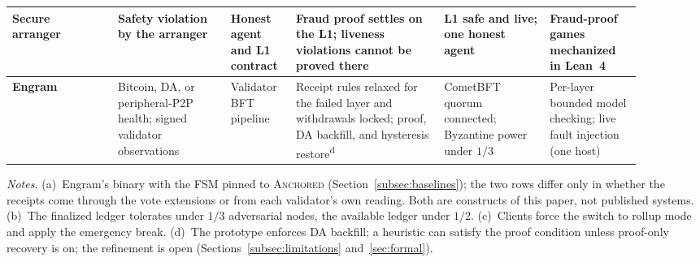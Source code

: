 {\begin{longtable}{@{}>{\rc}p{0.155\linewidth}>{\rc}p{0.16\linewidth}>{\rc}p{0.09\linewidth}>{\rc}p{0.215\linewidth}>{\rc}p{0.15\linewidth}>{\rc}p{0.13\linewidth}@{}}
Secure arranger~\mbox{\cite{capretto2025secure}} & Safety violation by the arranger & Honest agent and L1 contract & Fraud proof settles on the L1; liveness violations cannot be proved there & L1 safe and live; one honest agent & Fraud-proof games mechanized in Lean~4 \\
\midrule
\textbf{Engram} & Bitcoin, DA, or peripheral-P2P health; signed validator observations & Validator BFT pipeline & Receipt rules relaxed for the failed layer and withdrawals locked; proof, DA backfill, and hysteresis restore\textsuperscript{d} & CometBFT quorum connected; Byzantine power under $1/3$ & Per-layer bounded model checking; live fault injection (one host) \\
\end{longtable}

\par\medskip
{\scriptsize\raggedright
\textit{Notes.}
(a)~Engram's binary with the FSM pinned to \textsc{Anchored}
(Section~\ref{subsec:baselines}); the two rows differ only in whether the receipts
come through the vote extensions or from each validator's own reading. Both are constructs of
this paper, not published systems.
(b)~The finalized ledger tolerates under $1/3$ adversarial nodes, the
available ledger under $1/2$.
(c)~Clients force the switch to rollup mode and apply the emergency break.
(d)~The prototype enforces DA backfill; a heuristic can satisfy the proof
condition unless proof-only recovery is on; the refinement is open
(Sections~\ref{subsec:limitations} and~\ref{sec:formal}).\par}
}

